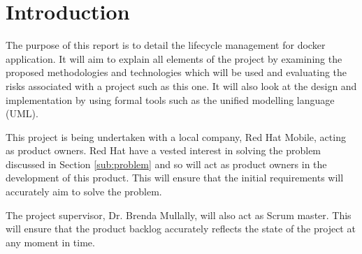 \section{Introduction}
The purpose of this report is to detail the \gls{lifecycle management} for \gls{docker} application. It will aim to explain all elements of the project by examining the proposed methodologies and technologies which will be used and evaluating the risks associated with a project such as this one. It will also look at the design and implementation by using formal tools such as the unified modelling language (UML).

This project is being undertaken with a local company, Red Hat Mobile, acting as product owners. Red Hat have a vested interest in solving the problem discussed in Section \ref{sub:problem} and so will act as product owners in the development of this product. This will ensure that the initial requirements will accurately aim to solve the problem. 

The project supervisor, Dr. Brenda Mullally, will also act as Scrum master. This will ensure that the product backlog accurately reflects the state of the project at any moment in time. 
